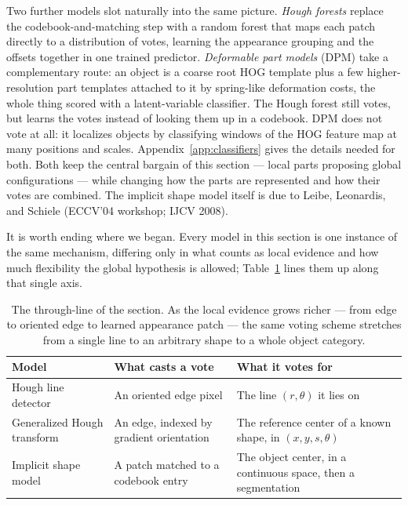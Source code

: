 \noindent
Two further models slot naturally into the same picture. \emph{Hough forests}
replace the codebook-and-matching step with a random forest that maps each patch
directly to a distribution of votes, learning the appearance grouping and the
offsets together in one trained predictor. \emph{Deformable part models} (DPM)
take a complementary route: an object is a coarse root HOG template plus a few
higher-resolution part templates attached to it by spring-like deformation costs,
the whole thing scored with a latent-variable classifier. The Hough forest
still votes, but learns the votes instead of looking them up in a codebook. DPM
does not vote at all: it localizes objects by classifying windows of the HOG
feature map at many positions and scales.
Appendix~\ref{app:classifiers} gives the details needed for both. Both keep the central
bargain of this section --- local parts proposing global configurations --- while
changing how the parts are represented and how their votes are combined. The
implicit shape model itself is due to Leibe, Leonardis, and Schiele (ECCV'04
workshop; IJCV 2008).

It is worth ending where we began. Every model in this section is one instance of
the same mechanism, differing only in what counts as local evidence and how much
flexibility the global hypothesis is allowed; Table~\ref{tab:voting-recap} lines
them up along that single axis.

\begin{table}[ht]
  \centering
  \begin{tabular}{@{}p{3.6cm}p{4.6cm}p{5.4cm}@{}}
    \toprule
    Model & What casts a vote & What it votes for \\
    \midrule
    Hough line detector & An oriented edge pixel & The line $(r,\theta)$ it lies
      on \\
    Generalized Hough transform & An edge, indexed by gradient orientation & The
      reference center of a known shape, in $(x,y,s,\theta)$ \\
    Implicit shape model & A patch matched to a codebook entry & The object
      center, in a continuous space, then a segmentation \\
    \bottomrule
  \end{tabular}
  \caption{The through-line of the section. As the local evidence grows richer ---
  from edge to oriented edge to learned appearance patch --- the same voting
  scheme stretches from a single line to an arbitrary shape to a whole object
  category.}
  \label{tab:voting-recap}
\end{table}
